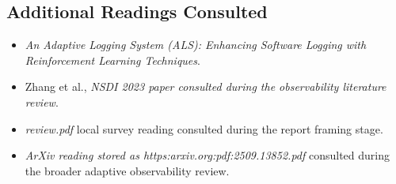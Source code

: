 \documentclass[10pt,twocolumn]{article}
\begin{document}
\subsection*{Additional Readings Consulted}
\begin{itemize}
  \item \emph{An Adaptive Logging System (ALS): Enhancing Software Logging with Reinforcement Learning Techniques}.
  \item Zhang et al., \emph{NSDI 2023 paper consulted during the observability literature review}.
  \item \emph{review.pdf} local survey reading consulted during the report framing stage.
  \item \emph{ArXiv reading stored as https:arxiv.org:pdf:2509.13852.pdf} consulted during the broader adaptive observability review.
\end{itemize}
\end{document}
